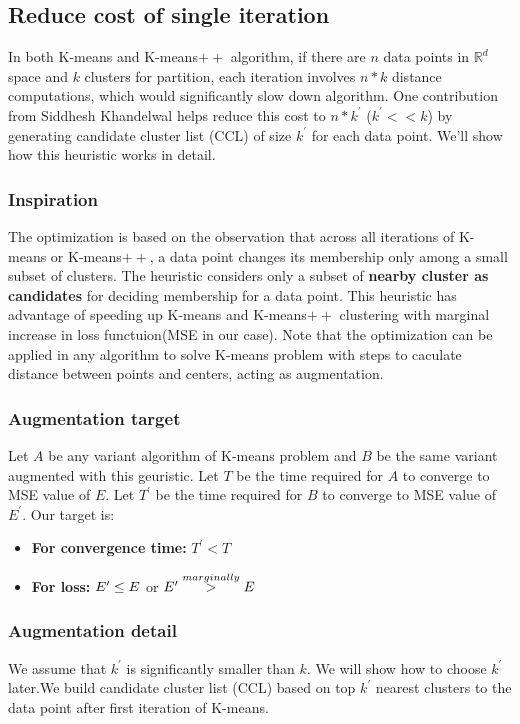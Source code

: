 \documentclass[11pt]{article}
\begin{document}
\subsection{Reduce cost of single iteration}
In both K-means and K-means$++$ algorithm, if there are $n$ data points in $\mathbb{R}^ d$ space and $k$ clusters for partition, each iteration involves $n * k$ distance computations, which would significantly slow down algorithm. One contribution from Siddhesh Khandelwal\cite{Faster} helps reduce this cost to $n * k^{\prime}$ ($k^{\prime} << k$) by generating candidate cluster list (CCL) of size $k^{\prime}$ for each data point. We'll show how this heuristic works in detail.
\subsubsection{Inspiration}
The optimization is based on the observation that across all iterations of K-means or K-means$++$, a data point changes its membership only among a small subset of clusters. The heuristic considers only a subset of \textbf{nearby cluster as candidates} for deciding membership for a data point. This heuristic has advantage of speeding up K-means and K-means$++$ clustering with marginal increase in loss functuion(MSE in our case). Note that the optimization can be applied in any algorithm to solve K-means problem with steps to caculate distance between points and centers, acting as augmentation.
\subsubsection{Augmentation target}
Let $A$ be any variant algorithm of K-means problem and $B$ be the same variant augmented with this geuristic. Let $T$ be the time required for $A$ to converge to MSE value of $E$. Let $T^{\prime}$ be the time required for $B$ to converge to MSE value of $E^{\prime}$. Our target is:
\begin{itemize}
\item \textbf{For convergence time:} $T^{\prime} < T$
\item \textbf{For loss:} $E^{\prime} \le E \space $ or $ \space E^{\prime} \overset{marginally}{>} E$
\end{itemize}

\subsubsection{Augmentation detail}
\par We assume that $k^{\prime}$ is significantly smaller than $k$. We will show how to choose $k^{\prime}$ later.We build candidate cluster list (CCL) based on top $k^{\prime}$ nearest clusters to the data point after first iteration of K-means. \par
\end{document}
